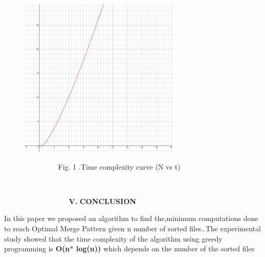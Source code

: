 \documentclass[10pt]{report}
\begin{document}
\begin{multicols}{2}
\vspace{\baselineskip}



\begin{figure}[H]
	\begin{Center}
		\includegraphics[width=3.0in,height=3.0in]{./media/image2.png}
	\end{Center}
\end{figure}




\vspace{\baselineskip}
\vspace{\baselineskip}
{\fontsize{9pt}{10.8pt}\selectfont \ \ \ \ \ \ \ \ \ \ \ \ \ \ \  Fig. 1 .Time complexity curve (N vs t) }

\vspace{\baselineskip}

\vspace{\baselineskip}

\vspace{\baselineskip}
\textbf{\ \ \ \ \ \ \ \ \ \ \ \  }\  

\vspace{\baselineskip}
{\fontsize{9pt}{10.8pt}\selectfont \ \ \ \ \ \ \ \ \ \ \ \ \ \ \ \  }\ \  {\fontsize{12pt}{14.4pt}\selectfont \textbf{V.} }{\fontsize{12pt}{14.4pt}\selectfont \textbf{C}}\textbf{ONCLUSION }

\vspace{\baselineskip}
In this paper we proposed an algorithm to find the\textcolor[HTML]{40424E}{,minimum computations done to reach Optimal Merge Pattern given n number of sorted files..}The experimental study showed that the time complexity of the algorithm using greedy programming is \textbf{O(n$\ast$ log(n)) }which depends on the number of the sorted files 


\end{multicols}
\end{document}
